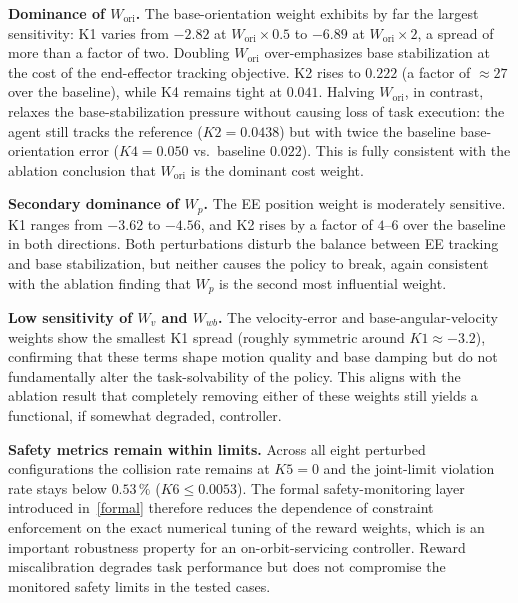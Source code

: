 \documentclass{ieeeaccess}
\begin{document}
\noindent\textbf{Dominance of $W_{\mathrm{ori}}$.} The base-orientation weight exhibits by far the largest sensitivity:
K1 varies from $-2.82$ at $W_{\mathrm{ori}}\times 0.5$ to $-6.89$ at $W_{\mathrm{ori}}\times 2$, a spread
of more than
a factor of two. Doubling $W_{\mathrm{ori}}$ over-emphasizes base stabilization at the cost of the
end-effector tracking
objective. K2 rises to $0.222$ (a factor of $\approx 27$ over the baseline), while
K4 remains tight at $0.041$.
Halving $W_{\mathrm{ori}}$, in contrast, relaxes the base-stabilization pressure without causing loss of task execution:
the agent still tracks the reference ($K2=0.0438$) but with twice the baseline base-orientation error
($K4=0.050$ vs.\ baseline $0.022$). This is fully consistent with the ablation conclusion that $W_{\mathrm{ori}}$
is the dominant cost weight.

\noindent\textbf{Secondary dominance of $W_p$.} The EE position weight is moderately sensitive. K1 ranges from
$-3.62$ to $-4.56$, and K2 rises by a factor of $4$--$6$ over the baseline
in both directions. Both perturbations
disturb the balance between EE tracking and base stabilization, but neither causes the policy
to break, again
consistent with the ablation finding that $W_p$ is the second most influential weight.

\noindent\textbf{Low sensitivity of $W_v$ and $W_{wb}$.} The velocity-error and base-angular-velocity weights show
the smallest K1 spread (roughly symmetric around $K1\approx -3.2$), confirming that these terms shape
motion
quality and base damping but do not fundamentally alter the task-solvability of the policy.
This aligns with the
ablation result that completely removing either of these weights still yields a functional, if
somewhat degraded,
controller.

\noindent\textbf{Safety metrics remain within limits.} Across all eight perturbed configurations the collision rate
remains at $K5=0$ and the joint-limit violation rate stays below $0.53\,\%$ ($K6 \le 0.0053$).
The formal
safety-monitoring layer introduced in~\autoref{formal} therefore reduces the dependence of constraint enforcement
on the exact numerical tuning of the reward weights, which is an important robustness
property for an
on-orbit-servicing controller. Reward miscalibration degrades task performance but does not compromise the
monitored safety limits in the tested cases.
\end{document}
